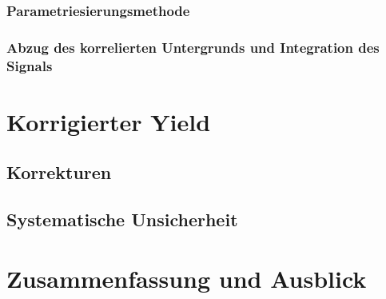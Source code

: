 \documentclass[11pt]{article}
\begin{document}
\subsubsection{Parametriesierungsmethode} \label{s3s5s3}

\subsubsection{Abzug des korrelierten Untergrunds und Integration des Signals} \label{s3s5s4}

\section{Korrigierter Yield} \label{s4}

\subsection{Korrekturen} \label{s4s1}

\subsection{Systematische Unsicherheit} \label{s4s2}

\section{Zusammenfassung und Ausblick} \label{s5}
\end{document}
